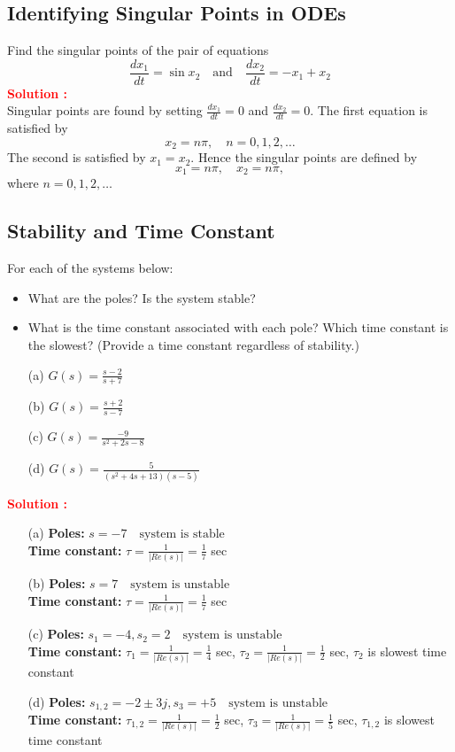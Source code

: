 \documentclass[12pt]{article}
\begin{document}
\clearpage
\subsection{Identifying Singular Points in ODEs}

Find the singular points of the pair of equations
\[
\frac{dx_1}{dt} = \sin x_2 \quad \text{and} \quad \frac{dx_2}{dt} = -x_1 + x_2
\]
\textbf{\textcolor{red}{Solution :}} \\
Singular points are found by setting \(\frac{dx_1}{dt} = 0\) and \(\frac{dx_2}{dt} = 0\). The first equation is satisfied by
\[ x_2 =  n\pi, \quad n = 0, 1, 2, \ldots \]
The second is satisfied by \(x_1 = x_2\). Hence the singular points are defined by
\[ x_1 =  n\pi, \quad x_2 =  n\pi, \]
where \(n = 0, 1, 2, \ldots\)

\clearpage
\subsection{Stability and Time Constant}

For each of the systems below:
\begin{itemize}
    \item What are the poles? Is the system stable?
    \item What is the time constant associated with each pole? Which time constant is the slowest? (Provide a time constant regardless of stability.)
\end{itemize}
\begin{itemize}
    \item[(a)] \(G(s) = \frac{s-2}{s+7}\)
    \item[(b)] \(G(s) = \frac{s+2}{s-7}\)
    \item[(c)] \(G(s) = \frac{-9}{s^2+2s-8}\)
    \item[(d)] \(G(s) = \frac{5}{(s^2+4s+13)(s-5)}\)
\end{itemize}
\textbf{\textcolor{red}{Solution :}} \\
\begin{itemize}
    \item[(a)] 
    \textbf{Poles:} \(s = -7 \quad \text{system is stable}\)\\
    \textbf{Time constant:} \(\tau = \frac{1}{|Re(s)|} = \frac{1}{7}\) sec
    \item[(b)] 
    \textbf{Poles:} \(s = 7 \quad \text{system is unstable}\)\\
    \textbf{Time constant:} \(\tau = \frac{1}{|Re(s)|} = \frac{1}{7}\) sec
    \item[(c)] 
    \textbf{Poles:} \(s_1 = -4, s_2 = 2 \quad \text{system is unstable}\)\\
    \textbf{Time constant:} \(\tau_1 = \frac{1}{|Re(s)|} = \frac{1}{4}\) sec, \(\tau_2 = \frac{1}{|Re(s)|} = \frac{1}{2}\) sec, \(\tau_2\) is slowest time constant
    \item[(d)]
    \textbf{Poles:} \(s_{1,2} = -2 \pm 3j, s_3 = +5 \quad \text{system is unstable}\)\\
    \textbf{Time constant:} \(\tau_{1,2} = \frac{1}{|Re(s)|} = \frac{1}{2}\) sec, \(\tau_3 = \frac{1}{|Re(s)|} = \frac{1}{5}\) sec, \(\tau_{1,2}\) is slowest time constant
\end{itemize}
\clearpage
\end{document}
